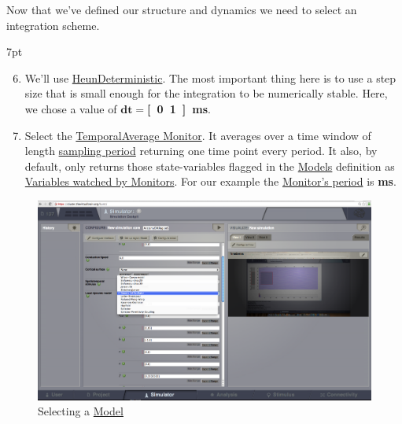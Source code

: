 \documentclass{tufte-handout}
\newenvironment{simulation}{%
  \def\FrameCommand{%
    \hspace{1pt}%
    {\color{ForestGreen}\vrule width 2pt}%
    {\color{simulationshade}\vrule width 4pt}%
    \colorbox{simulationshade}%
  }%
  \MakeFramed{\advance\hsize-\width\FrameRestore}%
  \noindent\hspace{-4.55pt}%
  \begin{adjustwidth}{}{7pt}%
  \vspace{2pt}\vspace{2pt}%
}
{%
  \vspace{2pt}\end{adjustwidth}\endMakeFramed%
}
\begin{document}
Now that we've defined our structure and dynamics we need to select an integration scheme. 

\begin{simulation}
\begin{enumerate}[resume]
  \setcounter{enumi}{5}

\item We'll use \underline{HeunDeterministic}. The most important thing here is to use a step size that is small enough for the integration to be numerically stable. Here, we chose a value of $\mathbf{dt=}$\textbf{\unit[0.1]{ms}}.

\item  Select the \underline{TemporalAverage Monitor}. It averages over a time window of length \underline{sampling period} returning one time point every period. It also, by default, only returns those state-variables flagged in the \underline{Models} definition as \underline{Variables watched by Monitors}. For our example the \underline{Monitor's period} is \textbf{\unit[1]{ms}}. 
\end{enumerate}
\end{simulation}

\begin{figure}[h]
  \includegraphics[width=\linewidth]{Handout_UI_BuildingYourOwnBrainNetworkModel_Model}%
  \caption{Selecting a \underline{Model}}%
  \label{fig:step_01}%
\end{figure}
\end{document}
